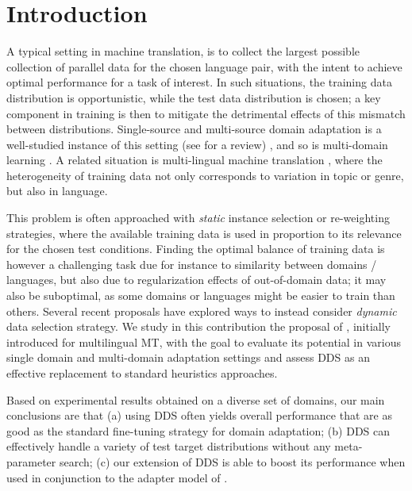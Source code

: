 \documentclass[11pt,a4paper]{article}
\newcommand{\fyTodo}[1]{\Todo[FY:]{\textcolor{orange}{#1}}}
\begin{document}
\section{Introduction}\label{sec:intro}
A typical setting in machine translation, is to collect the largest possible collection of parallel data for the chosen language pair, with the intent to achieve optimal performance for a task of interest. In such situations, the training data distribution is opportunistic, while the test data distribution is chosen; a key component in training is then to mitigate the detrimental effects of this mismatch between distributions. Single-source and multi-source domain adaptation is a well-studied instance of this setting (see \cite{Chu2017comparison} for a review) , and so is multi-domain learning \cite{Chu18multilingual,Zeng18multidomain,Jiang19multidomain}. A related situation is multi-lingual machine translation \cite{Firat16multiway,Ha16towards,Johnson17google,Arivazhagan19massively}\fyTodo{Add more recent work}, where the heterogeneity of training data not only corresponds to variation in topic or genre, but also in language.

\fyTodo{Label or covariate shift ?}
This problem is often approached with \emph{static} instance selection or re-weighting strategies, where the available training data is used in proportion to its relevance for the chosen test conditions. Finding the optimal balance of training data is however a challenging task due for instance to similarity between domains / languages, but also due to regularization effects of out-of-domain data; it may also be suboptimal, as some domains or languages might be easier to train than others. Several recent proposals \cite{Wang17instance,Kumar19reinforcement,Wang20learning-multi} have explored ways to instead consider \emph{dynamic} data selection strategy. We study in this contribution the proposal of \cite{Wang20balancing}, initially introduced for multilingual MT, with the goal to evaluate its potential in various single domain and multi-domain adaptation settings and assess DDS as an effective replacement to standard heuristics approaches.

Based on experimental results obtained on a diverse set of domains, our main conclusions are that (a) using DDS often yields overall performance that are as good as the standard fine-tuning strategy for domain adaptation; (b) DDS can effectively handle a variety of test target distributions without any meta-parameter search; (c) our extension of DDS is able to boost its performance when used in conjunction to the adapter model of \citet{Bapna19simple}.
\end{document}

